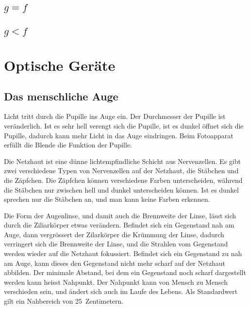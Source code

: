\documentclass[paper=a4,twoside=true,,DIV13,BCOR1cm]{scrartcl}
\begin{document}
\subsection*{$g=f$}

\subsection*{$g<f$}



\section{Optische Geräte}

\subsection{Das menschliche Auge}
\begin{center}
\end{center}

Licht tritt durch die Pupille ins Auge ein. Der Durchmesser der Pupille ist veränderlich. Ist es sehr hell verengt sich die Pupille,
ist es dunkel öffnet sich die Pupille, dadurch kann mehr Licht in das Auge eindringen. Beim Fotoapparat erfüllt die Blende die Funktion der Pupille. 

Die Netzhaut ist eine dünne lichtempfindliche Schicht aus Nervenzellen. Es gibt zwei verschiedene Typen von Nervenzellen auf der Netzhaut,
die Stäbchen und die Zäpfchen. Die Zäpfchen können verschiedene Farben unterscheiden, während die Stäbchen nur zwischen hell und dunkel unterscheiden können.
Ist es dunkel sprechen nur die Stäbchen an, und man kann keine Farben erkennen.

Die Form der Augenlinse, und damit auch die Brennweite der Linse, lässt sich durch die Ziliarkörper etwas verändern.
Befindet sich ein Gegenstand nah am Auge, dann vergrössert der Zilarkörper die Krümmung der Linse, dadurch verringert sich die Brennweite der Linse, und
die Strahlen vom Gegenstand werden wieder auf die Netzhaut fokussiert.
Befindet sich ein Gegenstand zu nah am Auge, kann dieses den Gegenstand nicht mehr scharf auf der Netzhaut abbilden.
Der minimale Abstand, bei dem ein Gegenstand noch scharf dargestellt werden kann heisst Nahpunkt.
Der Nahpunkt kann von Mensch zu Mensch verschieden sein, und ändert sich auch im Laufe des Lebens.
Als Standardwert gilt ein Nahbereich von \SI{25}{Zentimetern}.
\end{document}
